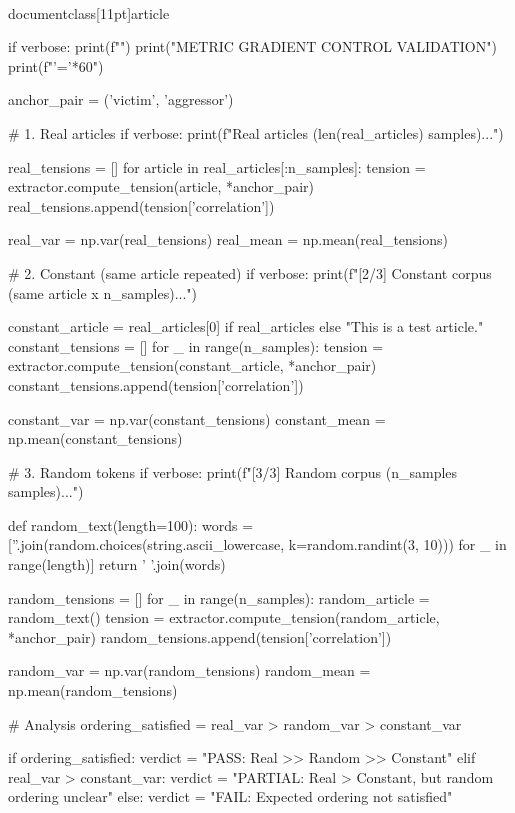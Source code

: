 \\documentclass[11pt]{article}
\begin{document}
\begin{CodeBlock}
    if verbose:
        print(f"")
        print("METRIC GRADIENT CONTROL VALIDATION")
        print(f"{'='*60}")
    
    anchor_pair = ('victim', 'aggressor')
    
    # 1. Real articles
    if verbose:
        print(f"\n[1/3] Real articles ({len(real_articles)} samples)...")
    
    real_tensions = []
    for article in real_articles[:n_samples]:
        tension = extractor.compute_tension(article, *anchor_pair)
        real_tensions.append(tension['correlation'])
    
    real_var = np.var(real_tensions)
    real_mean = np.mean(real_tensions)
    
    # 2. Constant (same article repeated)
    if verbose:
        print(f"[2/3] Constant corpus (same article x {n_samples})...")
    
    constant_article = real_articles[0] if real_articles else "This is a test article."
    constant_tensions = []
    for _ in range(n_samples):
        tension = extractor.compute_tension(constant_article, *anchor_pair)
        constant_tensions.append(tension['correlation'])
    
    constant_var = np.var(constant_tensions)
    constant_mean = np.mean(constant_tensions)
    
    # 3. Random tokens
    if verbose:
        print(f"[3/3] Random corpus ({n_samples} samples)...")
    
    def random_text(length=100):
        words = [''.join(random.choices(string.ascii_lowercase, k=random.randint(3, 10))) 
                 for _ in range(length)]
        return ' '.join(words)
    
    random_tensions = []
    for _ in range(n_samples):
        random_article = random_text()
        tension = extractor.compute_tension(random_article, *anchor_pair)
        random_tensions.append(tension['correlation'])
    
    random_var = np.var(random_tensions)
    random_mean = np.mean(random_tensions)
    
    # Analysis
    ordering_satisfied = real_var > random_var > constant_var
    
    if ordering_satisfied:
        verdict = "PASS: Real >> Random >> Constant"
    elif real_var > constant_var:
        verdict = "PARTIAL: Real > Constant, but random ordering unclear"
    else:
        verdict = "FAIL: Expected ordering not satisfied"
    

\end{CodeBlock}
\end{document}
